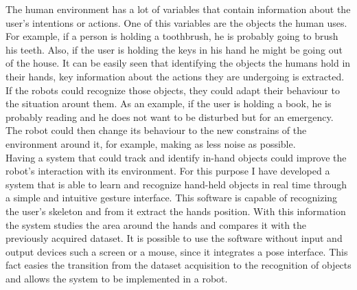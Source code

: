The human environment has a lot of variables that contain information about the user's intentions or actions. 
One of this variables are the objects the human uses. 
For example, if a person is holding a toothbrush, he is probably going to brush his teeth. 
Also, if the user is holding the keys in his hand he might be going out of the house. 
It can be easily seen that identifying the objects the humans hold in their hands, key information about the actions they are undergoing is extracted. 
If the robots could recognize those objects, they could adapt their behaviour to the situation arount them. 
As an example, if the user is holding a book, he is probably reading and  he does not want to be disturbed but for an emergency. 
The robot could then change its behaviour to the new constrains of the environment around it, for example, making as less noise as possible. 
\\

Having a system that could track and identify in-hand objects could improve the robot's interaction with its environment.
For this purpose I have developed a system that is able to learn and recognize hand-held objects in real time through a simple and intuitive gesture interface. 
This software is capable of recognizing the user's skeleton and from it extract the hands position. 
With this information the system studies the area around the hands and compares it with the previously acquired dataset.
It is possible to use the software without input and output devices such a screen or a mouse, since it integrates a pose interface. 
This fact easies the transition from the dataset acquisition to the recognition of objects and allows the system to be implemented in a robot. 













% 






